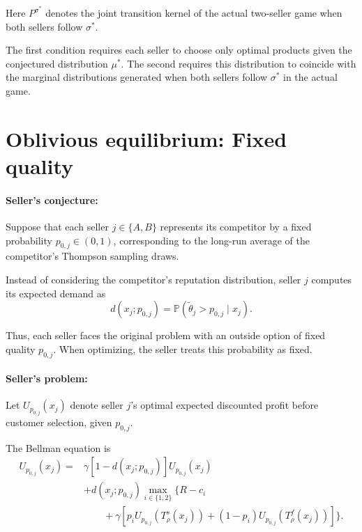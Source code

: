 \documentclass[11pt]{article}
\begin{document}
Here $P^{\sigma^*}$ denotes the joint transition kernel
of the actual two-seller game when both sellers follow
$\sigma^*$.

The first condition requires each seller to choose only
optimal products given the conjectured distribution $\mu^*$.
The second requires this distribution to coincide with the
marginal distributions generated when both sellers follow
$\sigma^*$ in the actual game.

\section{Oblivious equilibrium: Fixed quality}

\paragraph{Seller's conjecture:}
Suppose that each seller $j\in\{A,B\}$ represents its
competitor by a fixed probability $p_{0,j}\in(0,1)$,
corresponding to the long-run average of the competitor's
Thompson sampling draws.

Instead of considering the competitor's reputation
distribution, seller $j$ computes its expected demand as
\begin{equation}
d(x_j;p_{0,j}) = \mathbb{P}(\widetilde{\theta}_j>p_{0,j}\mid x_j).
\end{equation}

Thus, each seller faces the original problem with an
outside option of fixed quality $p_{0,j}$. When optimizing,
the seller treats this probability as fixed.


\paragraph{Seller's problem:}
Let $U_{p_{0,j}}(x_j)$ denote seller $j$'s optimal expected
discounted profit before customer selection, given
$p_{0,j}$.

The Bellman equation is
\begin{equation}
\begin{aligned}
U_{p_{0,j}}(x_j) ={}& \gamma[1-d(x_j;p_{0,j})]U_{p_{0,j}}(x_j)\\
& + d(x_j;p_{0,j}) \max_{i\in\{1,2\}} \Big\{ R-c_i\\
&\qquad+ \gamma\left[ p_iU_{p_{0,j}}(T_\rho^s(x_j)) + (1-p_i)U_{p_{0,j}}(T_\rho^f(x_j)) \right] \Big\}.
\end{aligned}
\end{equation}
\end{document}
